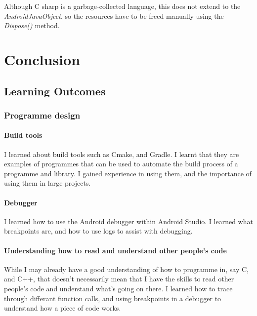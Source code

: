     Although C sharp is a garbage-collected language, this does not extend to the {\slshape AndroidJavaObject}, so the resources have to be freed manually using the {\slshape Dispose()} method.
    

\section{Conclusion}
    \subsection{Learning Outcomes}
        \subsubsection{Programme design}
            \paragraph{Build tools}
            I learned about build tools such as Cmake, and Gradle. I learnt that they are examples of programmes that can be used to automate the build process of a programme and library. I gained experience in using them, and the importance of using them in large projects.
            \paragraph{Debugger}
            I learned how to use the Android debugger within Android Studio. I learned what breakpoints are, and how to use logs to assist with debugging.
            \paragraph{Understanding how to read and understand other people's code}
            While I may already have a good understanding of how to programme in, say C, and C++, that doesn't necessarily mean that I have the skills to read other people's code and understand what's going on there. I learned how to trace through differant function calls, and using breakpoints in a debugger to understand how a piece of code works.
        